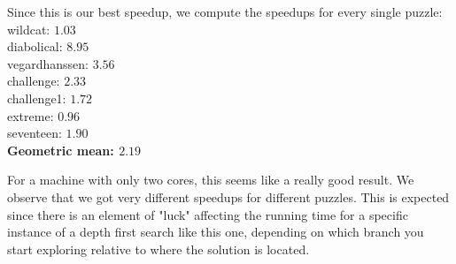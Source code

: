 \documentclass[a4paper]{article}
\begin{document}
Since this is our best speedup, we compute the speedups for every single puzzle:\\
wildcat: $1.03$\\
diabolical: $8.95$\\
vegard\textunderscore hanssen: $3.56$\\
challenge: $2.33$\\
challenge1: $1.72$\\
extreme: $0.96$\\
seventeen: $1.90$\\
\textbf{Geometric mean: $2.19$}

For a machine with only two cores, this seems like a really good result. We observe that we got very different speedups for different puzzles. This is expected since there is an element of "luck" affecting the running time for a specific instance of a depth first search like this one, depending on which branch you start exploring relative to where the solution is located.
\end{document}
